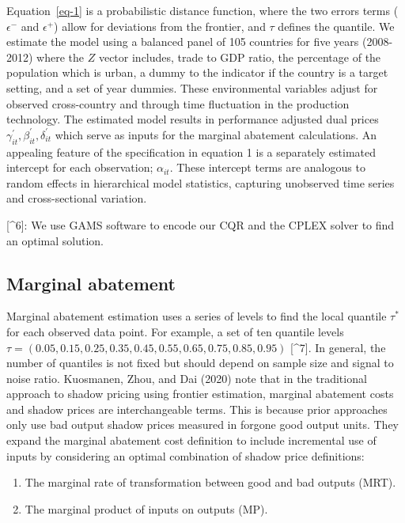 \documentclass[
  letterpaper,
  DIV=11,
  numbers=noendperiod]{scrartcl}
\providecommand{\tightlist}{%
  \setlength{\itemsep}{0pt}\setlength{\parskip}{0pt}}\usepackage{longtable,booktabs,array}
\begin{document}
Equation~\ref{eq-1} is a probabilistic distance function, where the two
errors terms (\(\epsilon^-\) and \(\epsilon^+\)) allow for deviations
from the frontier, and \(\tau\) defines the quantile. We estimate the
model using a balanced panel of 105 countries for five years (2008-2012)
where the \(Z\) vector includes, trade to GDP ratio, the percentage of
the population which is urban, a dummy to the indicator if the country
is a target setting, and a set of year dummies. These environmental
variables adjust for observed cross-country and through time fluctuation
in the production technology. The estimated model results in performance
adjusted dual prices \(\gamma^{'}_{it},\beta^{'}_{it} ,\delta^{'}_{it}\)
which serve as inputs for the marginal abatement calculations. An
appealing feature of the specification in equation 1 is a separately
estimated intercept for each observation; \(\alpha_{it}\). These
intercept terms are analogous to random effects in hierarchical model
statistics, capturing unobserved time series and cross-sectional
variation.

{[}\^{}6{]}: We use GAMS software to encode our CQR and the CPLEX solver
to find an optimal solution.

\hypertarget{marginal-abatement}{%
\subsection{Marginal abatement}\label{marginal-abatement}}

Marginal abatement estimation uses a series of levels to find the local
quantile \(\tau^{*}\) for each observed data point. For example, a set
of ten quantile levels
\(\tau=(0.05,0.15,0.25,0.35,0.45,0.55,0.65,0.75,0.85,0.95)\)
{[}\^{}7{]}. In general, the number of quantiles is not fixed but should
depend on sample size and signal to noise ratio. Kuosmanen, Zhou, and
Dai (2020) note that in the traditional approach to shadow pricing using
frontier estimation, marginal abatement costs and shadow prices are
interchangeable terms. This is because prior approaches only use bad
output shadow prices measured in forgone good output units. They expand
the marginal abatement cost definition to include incremental use of
inputs by considering an optimal combination of shadow price
definitions:

\begin{enumerate}
\def\labelenumi{\arabic{enumi}.}
\tightlist
\item
  The marginal rate of transformation between good and bad outputs
  (MRT).
\item
  The marginal product of inputs on outputs (MP).
\end{enumerate}
\end{document}
